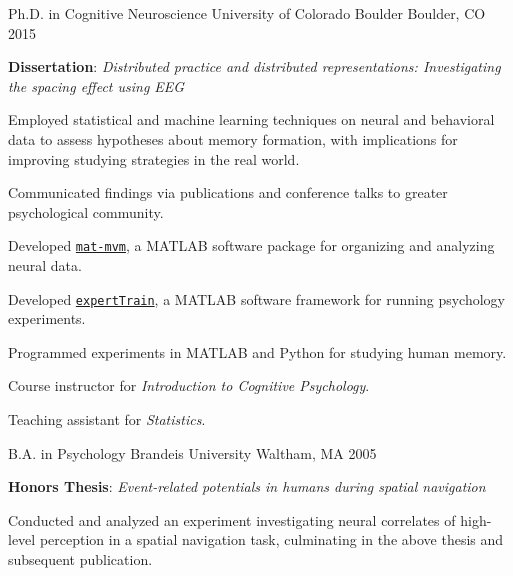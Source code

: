 

\begin{cventries}

  \cventry
    {Ph.D. in Cognitive Neuroscience} %
    {University of Colorado Boulder} %
    {Boulder, CO} %
    {2015} %
    {
      \begin{cvitems} %
        \item {\textbf{Dissertation}: \textit{Distributed practice and distributed representations: Investigating the spacing effect using EEG}}
        \item {Employed statistical and machine learning techniques on neural and behavioral data to assess hypotheses about memory formation, with implications for improving studying strategies in the real world.}
        \item {Communicated findings via publications and conference talks to greater psychological community.}
        \item {Developed {\href{https://github.com/warmlogic/mat-mvm}{\texttt{mat-mvm}}}, a MATLAB software package for organizing and analyzing neural data.}
        \item {Developed {\href{https://github.com/warmlogic/expertTrain}{\texttt{expertTrain}}}, a MATLAB software framework for running psychology experiments.}
        \item {Programmed experiments in MATLAB and Python for studying human memory.}
        \item {Course instructor for \textit{Introduction to Cognitive Psychology}.}
        \item {Teaching assistant for \textit{Statistics}.}
      \end{cvitems}
    }

  \cventry
    {B.A. in Psychology} %
    {Brandeis University} %
    {Waltham, MA} %
    {2005} %
    {
      \begin{cvitems} %
        \item {\textbf{Honors Thesis}: \textit{Event-related potentials in humans during spatial navigation}}
        \item {Conducted and analyzed an experiment investigating neural correlates of high-level perception in a spatial navigation task, culminating in the above thesis and subsequent publication.}
      \end{cvitems}
    }

\end{cventries}
